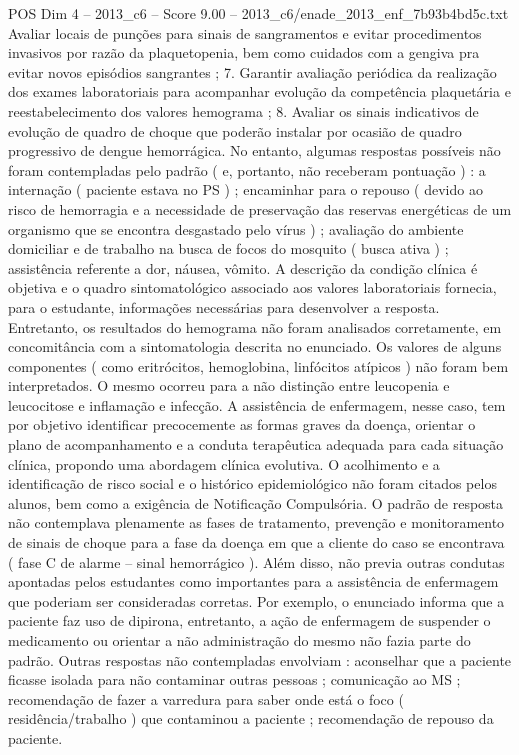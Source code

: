 \begin{textsample}{POS Dim 4 – 2013\_c6 – Score 9.00 – 2013\_c6/enade\_2013\_enf\_7b93b4bd5c.txt}
Avaliar locais de punções para sinais de sangramentos e evitar procedimentos invasivos por razão da plaquetopenia, bem como cuidados com a gengiva pra evitar novos episódios sangrantes ; 7.
Garantir avaliação periódica da realização dos exames laboratoriais para acompanhar evolução da competência plaquetária e reestabelecimento dos valores hemograma ; 8.
Avaliar os sinais indicativos de evolução de quadro de choque que poderão instalar por ocasião de quadro progressivo de dengue hemorrágica.
No entanto, algumas respostas possíveis não foram contempladas pelo padrão ( e, portanto, não receberam pontuação ) : a internação ( paciente estava no PS ) ; encaminhar para o repouso ( devido ao risco de hemorragia e a necessidade de preservação das reservas energéticas de um organismo que se encontra desgastado pelo vírus ) ; avaliação do ambiente domiciliar e de trabalho na busca de focos do mosquito ( busca ativa ) ; assistência referente a dor, náusea, vômito.
A descrição da condição clínica é objetiva e o quadro sintomatológico associado aos valores laboratoriais fornecia, para o estudante, informações necessárias para desenvolver a resposta.
Entretanto, os resultados do hemograma não foram analisados corretamente, em concomitância com a sintomatologia descrita no enunciado.
Os valores de alguns componentes ( como eritrócitos, hemoglobina, linfócitos atípicos ) não foram bem interpretados.
O mesmo ocorreu para a não distinção entre leucopenia e leucocitose e inflamação e infecção.
A assistência de enfermagem, nesse caso, tem por objetivo identificar precocemente as formas graves da doença, orientar o plano de acompanhamento e a conduta terapêutica adequada para cada situação clínica, propondo uma abordagem clínica evolutiva.
O acolhimento e a identificação de risco social e o histórico epidemiológico não foram citados pelos alunos, bem como a exigência de Notificação Compulsória.
O padrão de resposta não contemplava plenamente as fases de tratamento, prevenção e monitoramento de sinais de choque para a fase da doença em que a cliente do caso se encontrava ( fase C de alarme – sinal hemorrágico ).
Além disso, não previa outras condutas apontadas pelos estudantes como importantes para a assistência de enfermagem que poderiam ser consideradas corretas.
Por exemplo, o enunciado informa que a paciente faz uso de dipirona, entretanto, a ação de enfermagem de suspender o medicamento ou orientar a não administração do mesmo não fazia parte do padrão.
Outras respostas não contempladas envolviam : aconselhar que a paciente ficasse isolada para não contaminar outras pessoas ; comunicação ao MS ; recomendação de fazer a varredura para saber onde está o foco ( residência/trabalho ) que contaminou a paciente ; recomendação de repouso da paciente.

\end{textsample}
